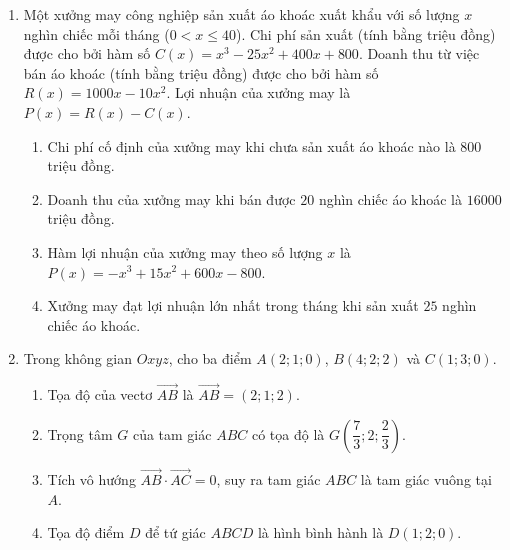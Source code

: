\documentclass[12pt,a4paper]{article}
\begin{document}
\newpage
\begin{enumerate}[start=2]
\item Một xưởng may công nghiệp sản xuất áo khoác xuất khẩu với số lượng $x$ nghìn chiếc mỗi tháng ($0 < x \le 40$). Chi phí sản xuất (tính bằng triệu đồng) được cho bởi hàm số $C(x)=x^3-25x^2+400x+800$. Doanh thu từ việc bán áo khoác (tính bằng triệu đồng) được cho bởi hàm số $R(x)=1000x-10x^2$. Lợi nhuận của xưởng may là $P(x)=R(x)-C(x)$.
\begin{enumerate}
\item Chi phí cố định của xưởng may khi chưa sản xuất áo khoác nào là $800$ triệu đồng.
\item Doanh thu của xưởng may khi bán được $20$ nghìn chiếc áo khoác là $16000$ triệu đồng.
\item Hàm lợi nhuận của xưởng may theo số lượng $x$ là $P(x)=-x^3+15x^2+600x-800$.
\item Xưởng may đạt lợi nhuận lớn nhất trong tháng khi sản xuất $25$ nghìn chiếc áo khoác.
\end{enumerate}

\item Trong không gian $Oxyz$, cho ba điểm $A(2;1;0)$, $B(4;2;2)$ và $C(1;3;0)$.
\begin{enumerate}
\item Tọa độ của vectơ $\vec{AB}$ là $\vec{AB}=(2;1;2)$.
\item Trọng tâm $G$ của tam giác $ABC$ có tọa độ là $G\left(\dfrac{7}{3};2;\dfrac{2}{3}\right)$.
\item Tích vô hướng $\vec{AB}\cdot\vec{AC}=0$, suy ra tam giác $ABC$ là tam giác vuông tại $A$.
\item Tọa độ điểm $D$ để tứ giác $ABCD$ là hình bình hành là $D(1;2;0)$.
\end{enumerate}


\end{enumerate}
\end{document}
